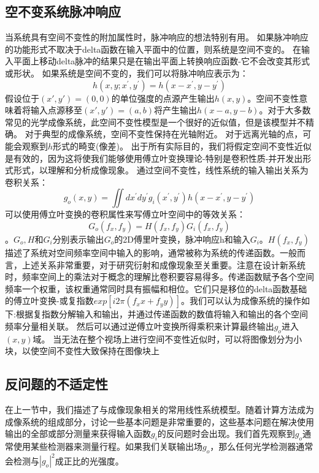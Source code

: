 \documentclass[12pt, UTF8]{ctexart}%
\numberwithin{equation}{section}
\numberwithin{figure}{section}
\newcommand{\InsertEqution}[2]{\begin{equation}
  \label{#1}
   #2
 \end{equation}}
\newcommand{\InsertInlineEq}[1]{$#1$}
\begin{document}
\begin{sloppypar}
\subsection{空不变系统脉冲响应}
当系统具有空间不变性的附加属性时，脉冲响应的想法特别有用。 如果脉冲响应的功能形式不取决于delta函数在输入平面中的位置，则系统是空间不变的。   在输入平面上移动delta脉冲的结果只是在输出平面上转换响应函数-它不会改变其形式或形状。 如果系统是空间不变的，我们可以将脉冲响应表示为：\InsertEqution{5.3}{h\left(x, y ; x^{\prime}, y^{\prime}\right)=h\left(x-x^{\prime}, y-y^{\prime}\right)}
假设位于\InsertInlineEq{(x',y')=(0,0)}的单位强度的点源产生输出\InsertInlineEq{h(x,y)}。空间不变性意味着将输入点源移至\InsertInlineEq{(x',y')=(a,b)}将产生输出\InsertInlineEq{h(x-a,y-b)}。对于大多数常见的光学成像系统，此空间不变性模型是一个很好的近似值，但是该模型并不精确。 对于典型的成像系统，空间不变性保持在光轴附近。 对于远离光轴的点，可能会观察到\InsertInlineEq{h}形式的畸变(像差)。 出于所有实际目的，我们将假定空间不变性近似是有效的，因为这将使我们能够使用傅立叶变换理论-特别是卷积性质-并开发出形式形式，以理解和分析成像现象。 通过空间不变性，线性系统的输入输出关系为卷积关系：
\InsertEqution{5.4}{g_{o}(x, y)=\iint d x^{\prime} d y^{\prime} g_{i}\left(x^{\prime}, y^{\prime}\right) h\left(x-x^{\prime}, y-y^{\prime}\right)}
可以使用傅立叶变换的卷积属性来写傅立叶空间中的等效关系：
\InsertEqution{5.5}{G_{o}\left(f_{x}, f_{y}\right)=H\left(f_{x}, f_{y}\right) G_{i}\left(f_{x}, f_{y}\right)}。\InsertInlineEq{G_o,H}和\InsertInlineEq{G_i}分别表示输出\InsertInlineEq{G_o}的2D傅里叶变换，脉冲响应h和输入\InsertInlineEq{G_i}。\InsertInlineEq{H(f_x,f_y)}描述了系统对空间频率空间中输入的影响，通常被称为系统的传递函数。一般而言，上述关系非常重要，对于研究衍射和成像现象至关重要。注意在设计新系统时，频率空间上的乘法对于概念的理解比卷积要容易得多。传递函数赋予各个空间频率一个权重，该权重通常同时具有振幅和相位。它们只是移位的delta函数基础的傅立叶变换-或复指数\InsertInlineEq{exp[i2\pi(f_x x+f_y y)]}。我们可以认为成像系统的操作如下:根据复指数分解输入和输出，并通过传递函数的数值将输入和输出的各个空间频率分量相关联。 然后可以通过逆傅立叶变换所得乘积来计算最终输出\InsertInlineEq{g_o}进入\InsertInlineEq{(x,y)}域。 当无法在整个视场上进行空间不变性近似时，可以将图像划分为小块，以使空间不变性大致保持在图像块上
\subsection{反问题的不适定性}
在上一节中，我们描述了与成像现象相关的常用线性系统模型。随着计算方法成为成像系统的组成部分，讨论一些基本问题是非常重要的，这些基本问题在解决使用输出的全部或部分测量来获得输入函数\InsertInlineEq{g_i}的反问题时会出现。我们首先观察到\InsertInlineEq{g_o}通常使用某些检测器来测量行程。如果我们关联输出场\InsertInlineEq{g_o}，那么任何光学检测器通常会检测与\InsertInlineEq{|g_o|^2}成正比的光强度。


\end{sloppypar}
\end{document}
